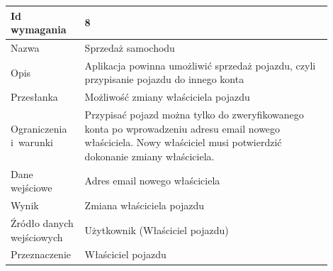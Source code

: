 \documentclass[12pt]{article}
\begin{document}
\begin{table}[H]
\begin{center}
	\begin{tabular}{|p{0.18\linewidth}|p{0.72\linewidth}|}%
	\hline
	Id wymagania 	& 8 				\\ \hline
	Nazwa			& Sprzedaż samochodu \\ \hline
	Opis &Aplikacja powinna umożliwić sprzedaż pojazdu, czyli przypisanie pojazdu do innego konta
\\ \hline
	Przesłanka & Możliwość zmiany właściciela pojazdu  \\ \hline
	Ograniczenia i~warunki & Przypisać pojazd można tylko do zweryfikowanego konta po wprowadzeniu adresu email nowego właściciela. Nowy właściciel musi potwierdzić dokonanie zmiany właściciela. \\ \hline
	Dane wejściowe &Adres email nowego właściciela \\ \hline
	Wynik & Zmiana właściciela pojazdu\\ \hline
	Źródło danych wejściowych &Użytkownik (Właściciel pojazdu)\\ \hline
	Przeznaczenie & Właściciel pojazdu\\ \hline
	\end{tabular}
\end{center}
\end{table}
\end{document}
